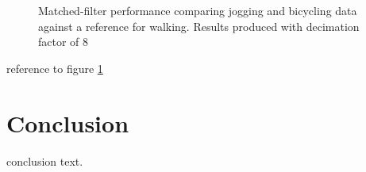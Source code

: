 \documentclass[journal]{IEEEtran}
\begin{document}
\begin{figure}[!ht]
  \centering
  \quad
  \centering
  \quad
  \centering
  \quad
  \caption{Matched-filter performance comparing jogging and bicycling data against a reference for walking. Results produced with decimation factor of 8}
  \label{ROC_walk_to_fig}
\end{figure}
%
reference to figure \ref{ROC_walk_to_fig}
%
\section{Conclusion}
conclusion text.
%
\appendices
%
\ifCLASSOPTIONcaptionsoff
  \newpage
\fi
%


\end{document}
